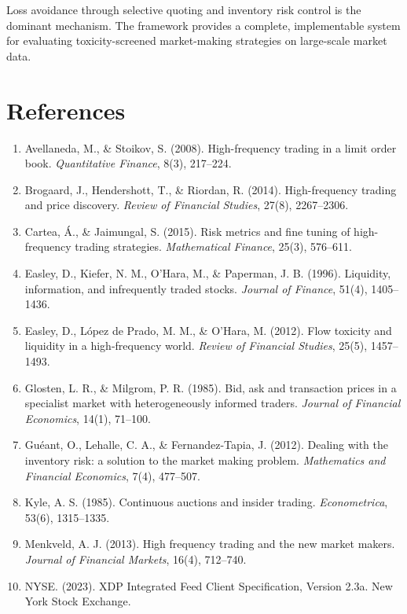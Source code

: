 \documentclass[11pt]{article}
\theoremstyle{definition}
\begin{document}
Loss avoidance through selective quoting and inventory risk control is the dominant mechanism. The framework provides a complete, implementable system for evaluating toxicity-screened market-making strategies on large-scale market data.



\section{References}

\begin{enumerate}
\item Avellaneda, M., \& Stoikov, S. (2008). High-frequency trading in a limit order book. \textit{Quantitative Finance}, 8(3), 217--224.

\item Brogaard, J., Hendershott, T., \& Riordan, R. (2014). High-frequency trading and price discovery. \textit{Review of Financial Studies}, 27(8), 2267--2306.

\item Cartea, \'{A}., \& Jaimungal, S. (2015). Risk metrics and fine tuning of high-frequency trading strategies. \textit{Mathematical Finance}, 25(3), 576--611.

\item Easley, D., Kiefer, N. M., O'Hara, M., \& Paperman, J. B. (1996). Liquidity, information, and infrequently traded stocks. \textit{Journal of Finance}, 51(4), 1405--1436.

\item Easley, D., L\'{o}pez de Prado, M. M., \& O'Hara, M. (2012). Flow toxicity and liquidity in a high-frequency world. \textit{Review of Financial Studies}, 25(5), 1457--1493.

\item Glosten, L. R., \& Milgrom, P. R. (1985). Bid, ask and transaction prices in a specialist market with heterogeneously informed traders. \textit{Journal of Financial Economics}, 14(1), 71--100.

\item Gu\'{e}ant, O., Lehalle, C. A., \& Fernandez-Tapia, J. (2012). Dealing with the inventory risk: a solution to the market making problem. \textit{Mathematics and Financial Economics}, 7(4), 477--507.

\item Kyle, A. S. (1985). Continuous auctions and insider trading. \textit{Econometrica}, 53(6), 1315--1335.

\item Menkveld, A. J. (2013). High frequency trading and the new market makers. \textit{Journal of Financial Markets}, 16(4), 712--740.

\item NYSE. (2023). XDP Integrated Feed Client Specification, Version 2.3a. New York Stock Exchange.
\end{enumerate}
\end{document}

